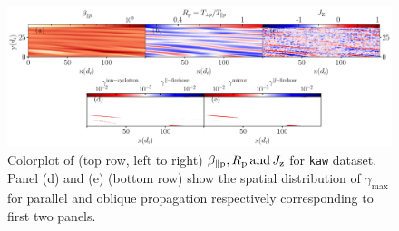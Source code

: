             \begin{figure}
                \begin{center}
                    \includegraphics[width=1\textwidth]{figures/chap5/data_Rp_betap_jz_b_kaw_ti0p6te0p6_Time6000wpe_gamma_k_kaw_ti0p6te0p6_Time6000wpe.pdf}
                    \caption[Plot of $\beta_{\parallel \rm p}, R_{\rm p}, J_{\rm z} \mathrm{\,and\,}
                    \gamma$ for \texttt{kaw} dataset]{Colorplot of (top row, left to right)
                    $\beta_{\parallel \rm p}, R_{\rm p} \mathrm{\,and\,} J_{\rm z}$ for \texttt{kaw}
                    dataset. Panel (d) and (e) (bottom row) show the spatial distribution of
                    $\gamma_{\max}$ for parallel and oblique propagation respectively corresponding
                    to first two panels.}
                    \label{fig:brjkaw}
                \end{center}
            \end{figure}

